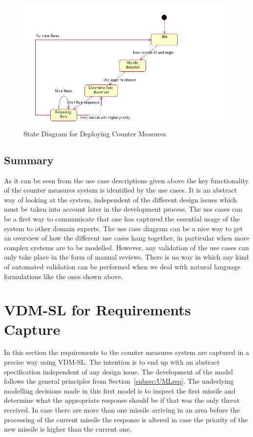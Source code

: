 \documentclass{overturerepchap}
\begin{document}
\begin{figure}
\begin{center}
\includegraphics[width=\textwidth]{figures/CMstate.png}
\end{center}
\caption{State Diagram for Deploying Counter Measures\label{fig:counterstate}}
\end{figure}

\subsection{Summary}

As it can be seen from the use case descriptions given above the key
functionality of the counter measures system is identified by the use
cases. It is an abstract way of looking at the system, independent of
the different design issues which must be taken into account later in
the development process. The use cases can be a first way to
communicate that one has captured the essential usage of the system to
other domain experts. The use case diagram can be a nice way to get an
overview of how the different use cases hang together, in particular
when more complex systems are to be modelled.  However, any validation
of the use cases can only take place in the form of manual
reviews. There is no way in which any kind of automated validation can
be performed when we deal with natural language formulations like the
ones shown above.

\section{VDM-SL for Requirements Capture}\label{sec:VDMSLreq}\label{sec:VDMSL}

In this section the requirements to the counter measures system are
captured in a precise way using VDM-SL. The intention is to end up
with an abstract specification independent of any design issue. The
development of the model follows the general principles from
Section~\ref{subsec:UMLreq}. The underlying modelling decisions made
in this first model is to inspect the first missile and determine what
the appropriate response should be if that was the only threat received.
In case there are more than one missile arriving in an area before the 
processing of the current missile the response is altered in case the 
priority of the new missile is higher than the current one.
\end{document}
